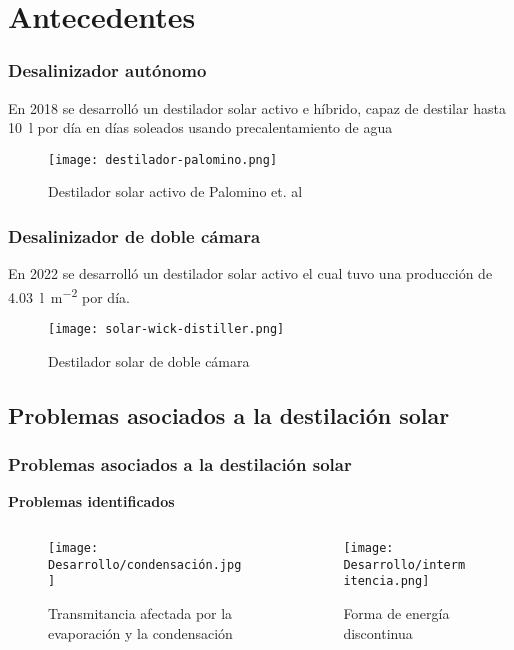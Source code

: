 \section{Antecedentes}

\begin{frame}
	\frametitle{Desalinizador autónomo}
	En 2018 se desarrolló un destilador solar activo e híbrido, capaz de destilar hasta \SI{10}{\litre} por día en días soleados usando precalentamiento de agua\\
	\begin{figure}
		\centering
		\texttt{[image: destilador-palomino.png]}
		\caption{Destilador solar activo de Palomino et. al}
		{\scriptsize{}}
	\end{figure}
\end{frame}


\begin{frame}
	\frametitle{Desalinizador de doble cámara}
	En 2022 se desarrolló un destilador solar activo el cual tuvo una producción de \qty{4.03}{\litre\per\metre\tothe{2}} por día.\\
	\begin{figure}
		\centering
		\texttt{[image: solar-wick-distiller.png]}
		\caption{Destilador solar de doble cámara}
		{\scriptsize{}}
	\end{figure}
\end{frame}

\subsection{Problemas asociados a la destilación solar}
	\begin{frame}
	    \frametitle{Problemas asociados a la destilación solar}
	    \vspace*{2mm}
	    
	    \textbf{\large Problemas identificados}\\[5mm]
	    
	    \begin{columns}
	    		\begin{column}{0.5\linewidth}
	    			\begin{figure}
	    				\texttt{[image: Desarrollo/condensación.jpg]}
	    				\caption{Transmitancia afectada por la evaporación y la condensación}
	    			\end{figure}
		    \end{column}
		    \begin{column}{0.5\linewidth}
		    		\begin{figure}
	    				\texttt{[image: Desarrollo/intermitencia.png]}
	    				\caption{Forma de energía discontinua}
	    			\end{figure}
		    \end{column}
	    \end{columns}
	\end{frame}